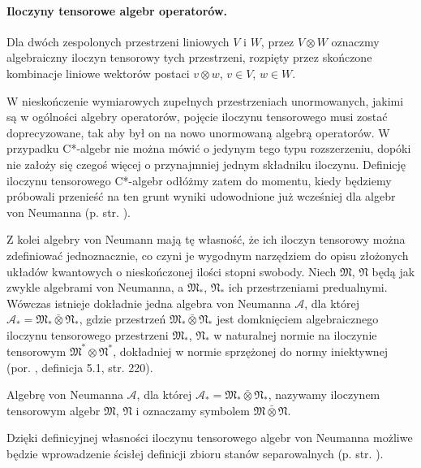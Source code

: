 \paragraph{Iloczyny tensorowe algebr operatorów.}
Dla dwóch zespolonych przestrzeni liniowych $V$ i $W$,
przez $V \! \otimes \! W$ oznaczmy algebraiczny iloczyn tensorowy tych przestrzeni,
rozpięty przez skończone kombinacje liniowe wektorów postaci
$v \otimes w$, $v \in V$, $w \in W$.

W nieskończenie wymiarowych zupełnych przestrzeniach unormowanych,
jakimi są w ogólności algebry operatorów,
pojęcie iloczynu tensorowego musi zostać doprecyzowane, tak aby
był on na nowo unormowaną algebrą operatorów.
W przypadku C*-algebr nie można mówić o jedynym tego typu rozszerzeniu,
dopóki nie założy się czegoś więcej o przynajmniej jednym składniku iloczynu.
Definicję iloczynu tensorowego C*-algebr odłóżmy zatem do momentu,
kiedy będziemy próbowali przenieść na ten grunt wyniki udowodnione już
wcześniej dla algebr von Neumanna (p. str. \pageref{sec:HorCstar}).

Z kolei algebry von Neumann mają tę własność, że ich iloczyn
tensorowy można zdefiniować jednoznacznie,
co czyni je wygodnym narzędziem do opisu złożonych układów kwantowych
o nieskończonej ilości stopni swobody.
Niech $\mathfrak{M}$, $\mathfrak{N}$ będą jak zwykle algebrami von Neumanna,
a $\mathfrak{M}_{*}$, $\mathfrak{N}_{*}$ ich przestrzeniami predualnymi.
Wówczas istnieje dokładnie jedna algebra von Neumanna $\mathcal{A}$,
dla której
$\mathcal{A}_{*} = \mathfrak{M}_{*} \bar{\otimes} \mathfrak{N}_{*}$,
gdzie przestrzeń
$\mathfrak{M}_{*} \bar{\otimes} \mathfrak{N}_{*}$ jest domknięciem
algebraicznego iloczynu tensorowego przestrzeni
$\mathfrak{M}_{*}$, $\mathfrak{N}_{*}$ w naturalnej normie na iloczynie
tensorowym $\mathfrak{M}^{*} \otimes \mathfrak{N}^{*}$,
dokładniej w normie sprzężonej do normy iniektywnej
(por. \cite{Takesaki1}, definicja 5.1, str. 220).

\begin{Definition}
 \label{def:TensorProductOfvN}
    Algebrę von Neumanna $\mathcal{A}$, dla której
    $\mathcal{A}_{*} = \mathfrak{M}_{*} \bar{\otimes} \mathfrak{N}_{*}$,
    nazywamy iloczynem tensorowym algebr $\mathfrak{M}$, $\mathfrak{N}$
    i oznaczamy symbolem
    $\mathfrak{M} \bar{\otimes} \mathfrak{N}$.
\end{Definition}

Dzięki definicyjnej własności iloczynu tensorowego algebr von Neumanna
możliwe będzie wprowadzenie ścisłej definicji zbioru stanów separowalnych
(p. str. \pageref{def:SeparableStates}).

